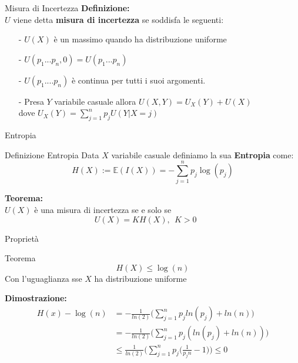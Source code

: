 \documentclass{beamer}
\newtheorem{teo}{Teorema}[section]
\theoremstyle{definition}
\numberwithin{equation}{section}
\newcommand{\sumj}{\sum_{j=1}^n}
\begin{document}
\begin{frame}[t]{Misura di Incertezza}
\vspace{14pt}
\large \textbf{Definizione:}\\
$U$ viene detta \textbf{misura di incertezza} se soddisfa le seguenti:
\begin{enumerate}
\item[-] $U(X)$ è un massimo quando ha distribuzione uniforme
\vspace{9pt}
\item[-] $U(p_1...p_n,0)=U(p_1...p_n)$
\vspace{9pt}
\item[-] $U(p_1....p_n)$ è continua per tutti i suoi argomenti.
\vspace{9pt}
\item[-] Presa $Y$ variabile casuale allora $U(X,Y)=U_X(Y)+U(X)$\\
 dove $U_X(Y)= \sumj p_j U(Y|X=j)$
\end{enumerate}
\end{frame}


\begin{frame}[t]{Entropia} \vspace{5pt}
\begin{block}{Definizione Entropia}
\vspace{0.5em}
Data $X$ variabile casuale definiamo la sua \textbf{Entropia} come:
\begin{equation*}
H(X):=\mathbb{E}(I(X))=-\sum_{j=1}^np_j\log(p_j)
\end{equation*}
\vspace{0.5em}
\end{block}
\vspace{20pt}
\large \textbf{Teorema:}\\
$U(X)$ è una misura di incertezza se e solo se 
$$U(X)= KH(X) , \ \ K>0 \ \ \ \ \ \ \ \ $$
\vspace{15pt}
\end{frame}


\begin{frame}[t]{Proprietà} \vspace{5pt}
\begin{block}{Teorema}
\begin{equation*}
H(X) \leq \log(n)
\end{equation*}
Con l'uguaglianza sse $X$ ha distribuzione uniforme
\end{block}
\vspace{10pt}
\large\textbf{Dimostrazione:}
\[
\begin{split}
H(x)-\log{(n)}
&=-\frac{1}{ln(2)} \bigg( \sumj p_j ln (p_j) + ln(n) \bigg)\\
&=-\frac{1}{ln(2)} \bigg( \sumj p_j (ln (p_j) + ln(n)) \bigg)\\
&\leq \frac{1}{ln(2)} \bigg( \sumj p_j \bigg( \frac{1}{p_jn} -1 \bigg) \bigg)\leq 0
\end{split}
\]
\vspace{30pt}
\end{frame}
\end{document}
